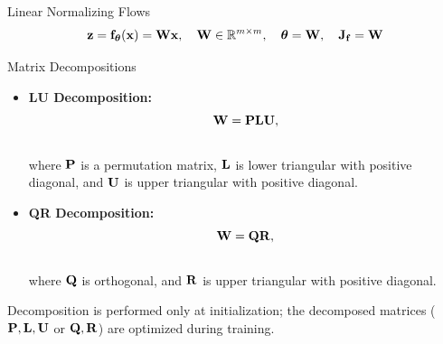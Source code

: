 \documentclass{beamer}
\begin{document}
\begin{frame}{Linear Normalizing Flows}
	\vspace{-0.3cm}
	\[
		\mathbf{z} = \mathbf{f}_{\boldsymbol{\theta}}(\mathbf{x}) = \mathbf{W} \mathbf{x}, \quad \mathbf{W} \in \mathbb{R}^{m \times m}, \quad \boldsymbol{\theta} = \mathbf{W}, \quad \mathbf{J}_{\mathbf{f}} = \mathbf{W}
	\]
	\vspace{-0.7cm}
	\eqpause
	\begin{block}{Matrix Decompositions}
		\begin{itemize}
			\item \textbf{LU Decomposition:}
			\vspace{-0.3cm}
			\[
				\mathbf{W} = \mathbf{P} \mathbf{L} \mathbf{U},
			\]
			\vspace{-0.7cm} \\
			where $\mathbf{P}$ is a permutation matrix, $\mathbf{L}$ is lower triangular with positive diagonal, and $\mathbf{U}$ is upper triangular with positive diagonal.
			\eqpause
			\item \textbf{QR Decomposition:}
			\vspace{-0.3cm}
			\[
				\mathbf{W} = \mathbf{Q} \mathbf{R},
			\]
			\vspace{-0.7cm} \\
			where $\mathbf{Q}$ is orthogonal, and $\mathbf{R}$ is upper triangular with positive diagonal.
		\end{itemize}
	\end{block}
    \eqpause
	Decomposition is performed only at initialization; the decomposed matrices ($\mathbf{P}, \mathbf{L}, \mathbf{U}$ or $\mathbf{Q}, \mathbf{R}$) are optimized during training.

\end{frame}
\end{document}
